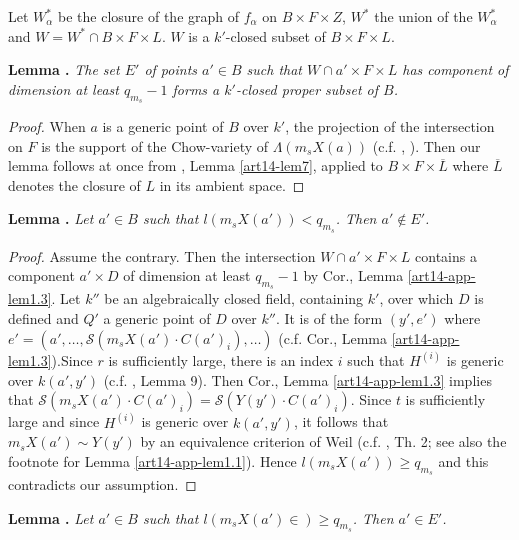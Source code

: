 Let $W^{*}_{\alpha}$ be the closure of the graph of $f_{\alpha}$ on $B\times F\times Z$, $W^{*}$ the union of the $W^{*}_{\alpha}$ and $W=W^{*}\cap B\times F\times L$. $W$ is a $k'$-closed subset of $B\times F\times L$.

\medskip
\noindent
{\bf Lemma .\label{art14-app-lem1.4}}
{\em The set $E'$ of points $a'\in B$ such that $W\cap a'\times F\times L$ has component of dimension at least $q_{m_{s}}-1$ forms a $k'$-closed proper subset of $B$.}

\begin{proof}
When $a$ is a generic point of $B$ over $k'$, the projection of the intersection on $F$ is the support of the Chow-variety of $\Lambda(m_{s}X(a))$ (c.f. \cite{art14-key14}, \cite{art14-key26}). Then our lemma follows at once from \cite{art14-key27}, Lemma \ref{art14-lem7}, applied to $B\times F\times \overline{L}$ where $\overline{L}$ denotes the closure of $L$ in its ambient space.
\end{proof}

\medskip
\noindent
{\bf Lemma .\label{art14-app-lem1.5}}
{\em Let $a'\in B$ such that $l(m_{s}X(a'))<q_{m_{s}}$. Then $a'\not\in E'$.}

\begin{proof}
Assume the contrary. Then the intersection $W\cap a'\times F\times L$ contains a component $a'\times D$ of dimension at least $q_{m_{s}}-1$ by Cor., Lemma \ref{art14-app-lem1.3}. Let $k''$ be an algebraically closed field, containing $k'$, over which $D$ is defined and $Q'$ a generic point of $D$ over $k''$. It is of the form $(y',e')$ where $e'=(a',\ldots,\mathscr{S}(m_{s}X(a')\cdot C(a')_{i}),\ldots)$ (c.f. Cor., Lemma \ref{art14-app-lem1.3}).\pageoriginale Since $r$ is sufficiently large, there is an index $i$ such that $H^{(i)}$ is generic over $k(a',y')$ (c.f. \cite{art14-key26}, Lemma 9). Then Cor., Lemma \ref{art14-app-lem1.3} implies that $\mathscr{S}(m_{s}X(a')\cdot C(a')_{i})=\mathscr{S}(Y(y')\cdot C(a')_{i})$. Since $t$ is sufficiently large and since $H^{(i)}$ is generic over $k(a',y')$, it follows that $m_{s}X(a')\sim Y(y')$ by an equivalence criterion of Weil (c.f. \cite{art14-key27}, Th. 2; see also the footnote for Lemma \ref{art14-app-lem1.1}). Hence $l(m_{s}X(a'))\geq q_{m_{s}}$ and this contradicts our assumption.
\end{proof}

\medskip
\noindent
{\bf Lemma .\label{art14-app-lem1.6}}
{\em Let $a'\in B$ such that $l(m_{s}X(a')\in)\geq q_{m_{s}}$. Then $a'\in E'$.}

